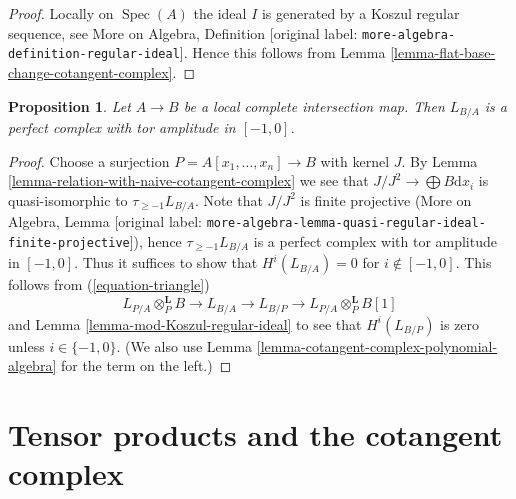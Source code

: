 \documentclass[10pt,a4paper]{article}
\theoremstyle{plain}
\newtheorem{proposition}[subsection]{Proposition}
\theoremstyle{definition}
\theoremstyle{remark}
\numberwithin{equation}{subsection}
\def\Spec{\mathop{\mathrm{Spec}}}
\begin{document}
\begin{proof}
Locally on $\Spec(A)$ the ideal $I$ is generated by a Koszul regular
sequence, see More on Algebra, Definition
\textnormal{[original label: \nolinkurl{more-algebra-definition-regular-ideal}]}.
Hence this follows from
Lemma \ref{lemma-flat-base-change-cotangent-complex}.
\end{proof}

\begin{proposition}
\label{proposition-cotangent-complex-local-complete-intersection}
Let $A \to B$ be a local complete intersection map.
Then $L_{B/A}$ is a perfect complex with tor amplitude in $[-1, 0]$.
\end{proposition}

\begin{proof}
Choose a surjection $P = A[x_1, \ldots, x_n] \to B$ with kernel $J$.
By Lemma \ref{lemma-relation-with-naive-cotangent-complex}
we see that $J/J^2 \to \bigoplus B\text{d}x_i$
is quasi-isomorphic to $\tau_{\geq -1}L_{B/A}$.
Note that $J/J^2$ is finite projective
(More on Algebra, Lemma
\textnormal{[original label: \nolinkurl{more-algebra-lemma-quasi-regular-ideal-finite-projective}]}),
hence $\tau_{\geq -1}L_{B/A}$ is a perfect complex with
tor amplitude in $[-1, 0]$.
Thus it suffices to show that $H^i(L_{B/A}) = 0$ for $i \not \in [-1, 0]$.
This follows from (\ref{equation-triangle})
$$
L_{P/A} \otimes_P^\mathbf{L} B \to L_{B/A} \to L_{B/P} \to
L_{P/A} \otimes_P^\mathbf{L} B[1]
$$
and Lemma \ref{lemma-mod-Koszul-regular-ideal}
to see that $H^i(L_{B/P})$ is zero unless $i \in \{-1, 0\}$.
(We also use Lemma \ref{lemma-cotangent-complex-polynomial-algebra}
for the term on the left.)
\end{proof}








\section{Tensor products and the cotangent complex}
\label{section-tensor-product}
\end{document}
